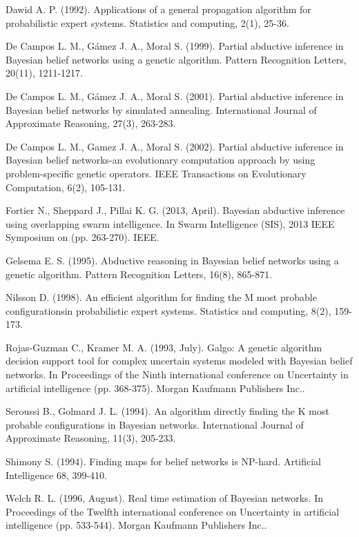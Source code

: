 \documentclass[a4paper,11pt]{article}
\begin{document}

\begin{thebibliography}{}

Dawid A. P. (1992). Applications of a general propagation algorithm for probabilistic expert systems. Statistics and computing, 2(1), 25-36.

De Campos L. M., Gámez J. A., Moral S. (1999). Partial abductive inference in Bayesian belief networks using a genetic algorithm. Pattern Recognition Letters, 20(11), 1211-1217.

De Campos L. M., Gámez J. A., Moral S. (2001). Partial abductive inference in Bayesian belief networks by simulated annealing. International Journal of Approximate Reasoning, 27(3), 263-283.

De Campos L. M., Gamez J. A., Moral S. (2002). Partial abductive inference in Bayesian belief networks-an evolutionary computation approach by using problem-specific genetic operators. IEEE Transactions on Evolutionary Computation, 6(2), 105-131.

Fortier N., Sheppard J., Pillai K. G. (2013, April). Bayesian abductive inference using overlapping swarm intelligence. In Swarm Intelligence (SIS), 2013 IEEE Symposium on (pp. 263-270). IEEE.

Gelsema E. S. (1995). Abductive reasoning in Bayesian belief networks using a genetic algorithm. Pattern Recognition Letters, 16(8), 865-871.

Nilsson D. (1998). An efficient algorithm for finding the M most probable configurationsin probabilistic expert systems. Statistics and computing, 8(2), 159-173.

Rojas-Guzman C., Kramer M. A. (1993, July). Galgo: A genetic algorithm decision support tool for complex uncertain systems modeled with Bayesian belief networks. In Proceedings of the Ninth international conference on Uncertainty in artificial intelligence (pp. 368-375). Morgan Kaufmann Publishers Inc..

Seroussi B., Golmard J. L. (1994). An algorithm directly finding the K most probable configurations in Bayesian networks. International Journal of Approximate Reasoning, 11(3), 205-233.

Shimony S. (1994). Finding maps for belief networks is NP-hard. Artificial Intelligence 68, 399-410.

Welch R. L. (1996, August). Real time estimation of Bayesian networks. In Proceedings of the Twelfth international conference on Uncertainty in artificial intelligence (pp. 533-544). Morgan Kaufmann Publishers Inc..

\end{thebibliography}
\end{document}
